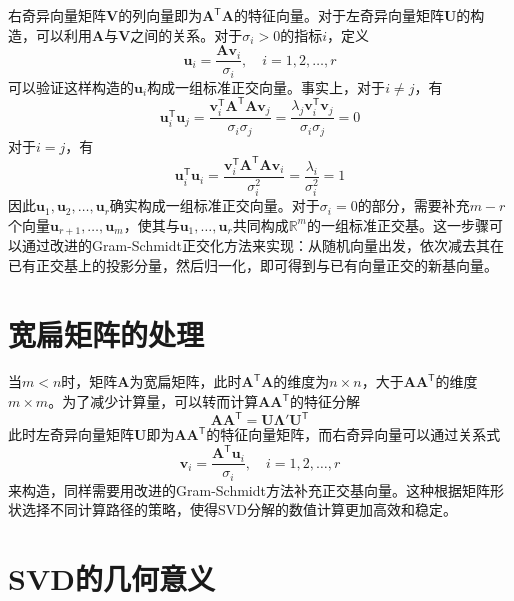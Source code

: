 \documentclass[a4paper,12pt]{ctexrep}
\begin{document}
右奇异向量矩阵$\bm{V}$的列向量即为$\bm{A}^{\mathsf{T}}\bm{A}$的特征向量。对于左奇异向量矩阵$\bm{U}$的构造，可以利用$\bm{A}$与$\bm{V}$之间的关系。对于$\sigma_i>0$的指标$i$，定义
\begin{equation}
    \bm{u}_i = \frac{\bm{A}\bm{v}_i}{\sigma_i}, \quad i=1,2,\ldots,r
\end{equation}
可以验证这样构造的$\bm{u}_i$构成一组标准正交向量。事实上，对于$i\neq j$，有
\begin{equation}
    \bm{u}_i^{\mathsf{T}}\bm{u}_j = \frac{\bm{v}_i^{\mathsf{T}}\bm{A}^{\mathsf{T}}\bm{A}\bm{v}_j}{\sigma_i\sigma_j} = \frac{\lambda_j\bm{v}_i^{\mathsf{T}}\bm{v}_j}{\sigma_i\sigma_j} = 0
\end{equation}
对于$i=j$，有
\begin{equation}
    \bm{u}_i^{\mathsf{T}}\bm{u}_i = \frac{\bm{v}_i^{\mathsf{T}}\bm{A}^{\mathsf{T}}\bm{A}\bm{v}_i}{\sigma_i^2} = \frac{\lambda_i}{\sigma_i^2} = 1
\end{equation}
因此$\bm{u}_1,\bm{u}_2,\ldots,\bm{u}_r$确实构成一组标准正交向量。对于$\sigma_i=0$的部分，需要补充$m-r$个向量$\bm{u}_{r+1},\ldots,\bm{u}_m$，使其与$\bm{u}_1,\ldots,\bm{u}_r$共同构成$\mathbb{R}^m$的一组标准正交基。这一步骤可以通过改进的Gram-Schmidt正交化方法来实现：从随机向量出发，依次减去其在已有正交基上的投影分量，然后归一化，即可得到与已有向量正交的新基向量。

\section{宽扁矩阵的处理}

当$m<n$时，矩阵$\bm{A}$为宽扁矩阵，此时$\bm{A}^{\mathsf{T}}\bm{A}$的维度为$n\times n$，大于$\bm{A}\bm{A}^{\mathsf{T}}$的维度$m\times m$。为了减少计算量，可以转而计算$\bm{A}\bm{A}^{\mathsf{T}}$的特征分解
\begin{equation}
    \bm{A}\bm{A}^{\mathsf{T}} = \bm{U}\bm{\Lambda}'\bm{U}^{\mathsf{T}}
\end{equation}
此时左奇异向量矩阵$\bm{U}$即为$\bm{A}\bm{A}^{\mathsf{T}}$的特征向量矩阵，而右奇异向量可以通过关系式
\begin{equation}
    \bm{v}_i = \frac{\bm{A}^{\mathsf{T}}\bm{u}_i}{\sigma_i}, \quad i=1,2,\ldots,r
\end{equation}
来构造，同样需要用改进的Gram-Schmidt方法补充正交基向量。这种根据矩阵形状选择不同计算路径的策略，使得SVD分解的数值计算更加高效和稳定。

\section{SVD的几何意义}
\end{document}
